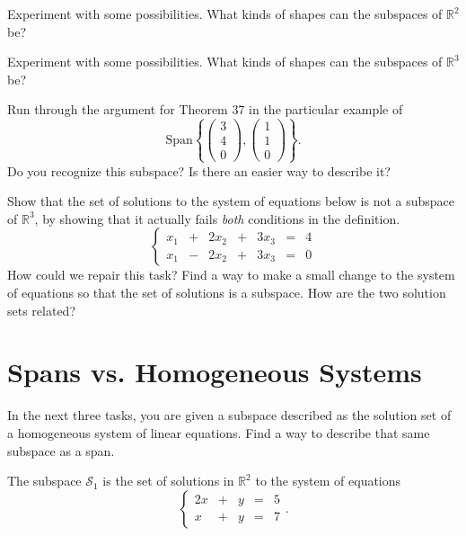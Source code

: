 \documentclass[cahier-main.tex]{subfiles}
\begin{document}
\begin{task}
Experiment with some possibilities. What kinds of shapes can the subspaces of $\mathbb{R}^2$ be?
\end{task}

\begin{task}
Experiment with some possibilities. What kinds of shapes can the subspaces of $\mathbb{R}^3$ be?
\end{task}

\begin{task}
Run through the argument for Theorem 37 in the particular example of 
\[
\mathrm{Span}\left\{\begin{pmatrix} 3 \\ 4 \\ 0 \end{pmatrix}, \begin{pmatrix} 1 \\ 1 \\ 0 \end{pmatrix} \right\}.
\]
Do you recognize this subspace? Is there an easier way to describe it?
\end{task}

\begin{task}
Show that the set of solutions to the system of equations below is not a subspace of $\mathbb{R}^3$, by showing that it actually fails \emph{both} conditions in the definition.
\[
\left\{ \begin{array}{rrrrrrr}
x_1 &+& 2x_2 &+& 3x_3 &=& 4 \\
x_1 &-& 2x_2 &+& 3x_3 &=& 0
\end{array}\right.
\]
How could we repair this task? Find a way to make a small change to the system of equations so that the set of solutions is a subspace. How are the two solution sets related? 
\end{task}

\section{Spans vs. Homogeneous Systems}

In the next three tasks, you are given a subspace described as the solution set of a homogeneous system of linear equations. Find a way to describe that same subspace as a span.

\begin{task} The subspace $\mathcal{S}_1$ is the set of solutions in $\mathbb{R}^2$ to the system of equations
\[
\left\{\begin{array}{rrrrr}
2x & + & y & = & 5 \\
x & + & y & = & 7
\end{array}\right. .
\]
\end{task}
\end{document}
